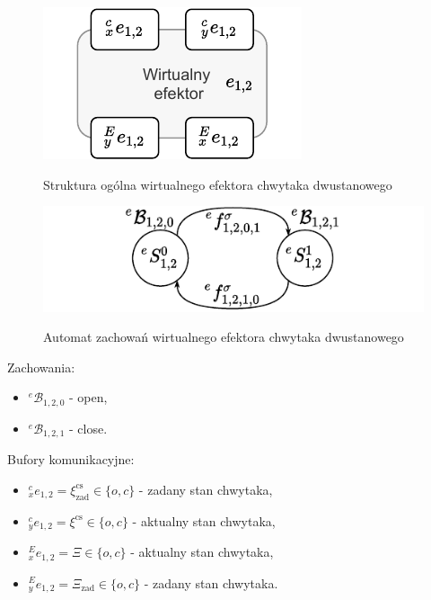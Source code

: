 \begin{figure}
    \centering
    \includegraphics[width=0.75\columnwidth]{figures/ISR-ve-gripper-model.pdf}
    \label{fig:model-ve-gripper}
    \caption{Struktura ogólna wirtualnego efektora chwytaka dwustanowego}
\end{figure}

\begin{figure}
    \centering
    \includegraphics[width=\columnwidth]{figures/ISR-ve-gripper-behaviours.pdf}
    \label{fig:zachowania-ve-gripper}
    \caption{Automat zachowań wirtualnego efektora chwytaka dwustanowego}
\end{figure}

Zachowania:
\begin{itemize}
    \item ${}^{e}\mathcal{B}_{1,2,0}$ - open,
    \item ${}^{e}\mathcal{B}_{1,2,1}$ - close.
\end{itemize}

Bufory komunikacyjne:
\begin{itemize}
    \item ${}^{c}_{x}e_{1,2} = \xi^{\mathrm{cs}}_{\mathrm{zad}} \in \{o, c\}$ - zadany stan chwytaka,
    \item ${}^{c}_{y}e_{1,2} = \xi^{\mathrm{cs}} \in \{o, c\}$ - aktualny stan chwytaka,
    \item ${}^{E}_{x}e_{1,2} = \Xi \in \{o, c\}$ - aktualny stan chwytaka,
    \item ${}^{E}_{y}e_{1,2} = \Xi_{\mathrm{zad}} \in \{o, c\}$ - zadany stan chwytaka.
\end{itemize}

